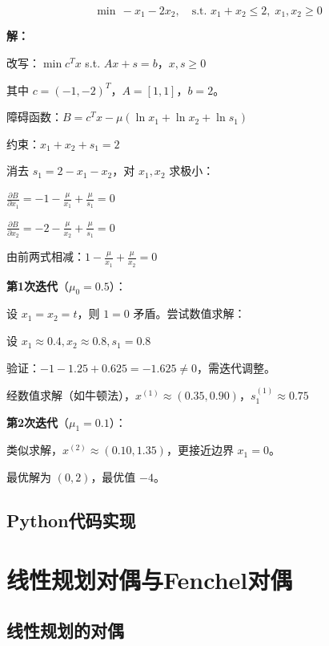 \begin{example}
\[
\min \, -x_1 - 2x_2, \quad \text{s.t. } x_1 + x_2 \leq 2, \; x_1, x_2 \geq 0
\]

\textbf{解：}

改写：$\min c^T x$ s.t. $Ax + s = b$，$x, s \geq 0$

其中 $c = (-1, -2)^T$，$A = [1, 1]$，$b = 2$。

障碍函数：$B = c^T x - \mu(\ln x_1 + \ln x_2 + \ln s_1)$

约束：$x_1 + x_2 + s_1 = 2$

消去 $s_1 = 2 - x_1 - x_2$，对 $x_1, x_2$ 求极小：

$\frac{\partial B}{\partial x_1} = -1 - \frac{\mu}{x_1} + \frac{\mu}{s_1} = 0$

$\frac{\partial B}{\partial x_2} = -2 - \frac{\mu}{x_2} + \frac{\mu}{s_1} = 0$

由前两式相减：$1 - \frac{\mu}{x_1} + \frac{\mu}{x_2} = 0$

\textbf{第1次迭代}（$\mu_0 = 0.5$）：

设 $x_1 = x_2 = t$，则 $1 = 0$ 矛盾。尝试数值求解：

设 $x_1 \approx 0.4, x_2 \approx 0.8, s_1 = 0.8$

验证：$-1 - 1.25 + 0.625 = -1.625 \neq 0$，需迭代调整。

经数值求解（如牛顿法），$x^{(1)} \approx (0.35, 0.90)$，$s_1^{(1)} \approx 0.75$

\textbf{第2次迭代}（$\mu_1 = 0.1$）：

类似求解，$x^{(2)} \approx (0.10, 1.35)$，更接近边界 $x_1 = 0$。

最优解为 $(0, 2)$，最优值 $-4$。
\end{example}

\subsection{Python代码实现}\label{sec:interior-code}

\section{线性规划对偶与Fenchel对偶}\label{sec:lp-conjugate}

\subsection{线性规划的对偶}


